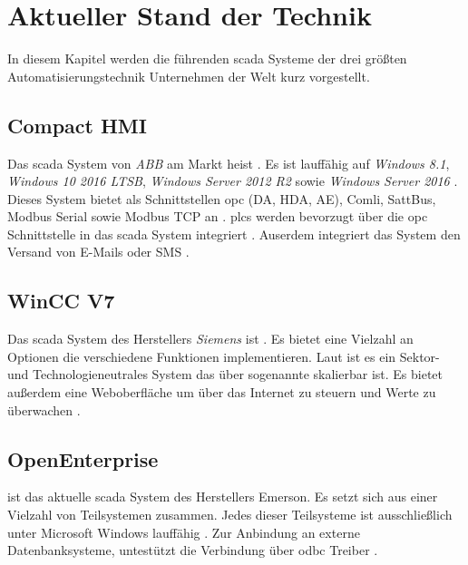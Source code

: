 \chapter{Aktueller Stand der Technik}
In diesem Kapitel werden die führenden \ac{scada} Systeme der drei größten Automatisierungstechnik Unternehmen der Welt \citep{umsatzAutomatisierungstechnik} kurz vorgestellt.
\section{Compact HMI}
Das \ac{scada} System von \emph{ABB} am Markt heist .
Es ist lauffähig auf \emph{Windows 8.1}, \emph{Windows 10 2016 LTSB}, \emph{Windows Server 2012 R2} sowie \emph{Windows Server 2016} \citep{abbOverview}.
Dieses System bietet als Schnittstellen \ac{opc} (DA, HDA, AE), Comli, SattBus, Modbus Serial sowie Modbus TCP an \citep{abbOverview}.
\acp{plc} werden bevorzugt über die \ac{opc} Schnittstelle in das \ac{scada} System integriert \citep{abbOverview}.
Auserdem integriert das System den Versand von E-Mails oder SMS \citep{abbOverview}.
\section{WinCC V7}
Das \ac{scada} System des Herstellers \emph{Siemens} ist .
Es bietet eine Vielzahl an Optionen die verschiedene Funktionen implementieren. 
Laut \citet{siemensOverview} ist es ein Sektor- und Technologieneutrales System das über sogenannte 
skalierbar ist. Es bietet außerdem eine Weboberfläche um über das Internet zu steuern und Werte zu überwachen \citep{siemensOverview}.
\section{OpenEnterprise}
 ist das aktuelle \ac{scada} System des Herstellers Emerson.
Es setzt sich aus einer Vielzahl von Teilsystemen zusammen.
Jedes dieser Teilsysteme ist ausschließlich unter Microsoft Windows lauffähig \citep{emersonOverview}.
Zur Anbindung an externe Datenbanksysteme, untestützt  die Verbindung über \ac{odbc} Treiber \citep{emersonOverview}.